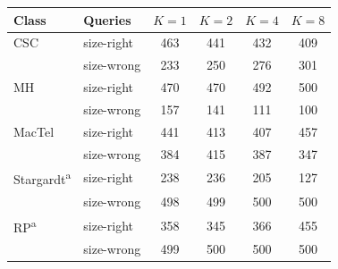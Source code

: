 \begin{tabular}{@{}llcccc@{}}
\toprule
Class & Queries & $K=1$ & $K=2$ & $K=4$ & $K=8$ \\
\midrule
CSC & size-right & 463 & 441 & 432 & 409 \\
 & size-wrong & 233 & 250 & 276 & 301 \\
\addlinespace[2pt]
MH & size-right & 470 & 470 & 492 & 500 \\
 & size-wrong & 157 & 141 & 111 & 100 \\
\addlinespace[2pt]
MacTel & size-right & 441 & 413 & 407 & 457 \\
 & size-wrong & 384 & 415 & 387 & 347 \\
\addlinespace[2pt]
Stargardt\textsuperscript{a} & size-right & 238 & 236 & 205 & 127 \\
 & size-wrong & 498 & 499 & 500 & 500 \\
\addlinespace[2pt]
RP\textsuperscript{a} & size-right & 358 & 345 & 366 & 455 \\
 & size-wrong & 499 & 500 & 500 & 500 \\
\bottomrule
\end{tabular}
